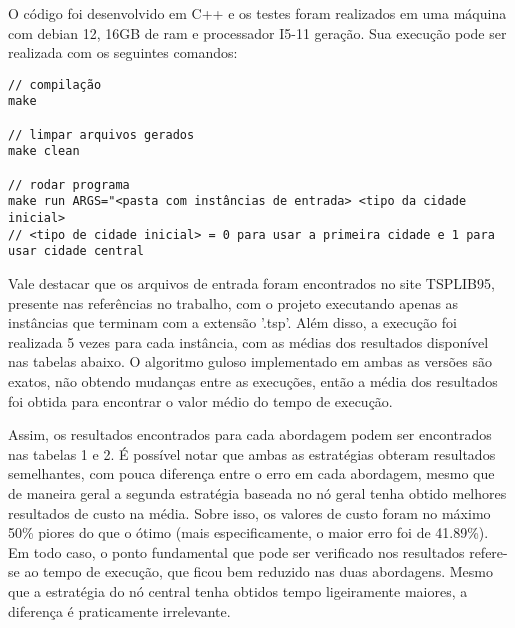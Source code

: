\documentclass[10pt]{extarticle} %
\begin{document}
O código foi desenvolvido em C++ e os testes foram realizados em uma máquina com debian 12, 16GB de ram e processador I5-11 geração. Sua execução pode ser realizada com os seguintes comandos:

\begin{verbatim}
// compilação
make

// limpar arquivos gerados
make clean

// rodar programa
make run ARGS="<pasta com instâncias de entrada> <tipo da cidade inicial>
// <tipo de cidade inicial> = 0 para usar a primeira cidade e 1 para usar cidade central
\end{verbatim}

Vale destacar que os arquivos de entrada foram encontrados no site TSPLIB95, presente nas referências no trabalho, com o projeto executando apenas as instâncias que terminam com a extensão '.tsp'. Além disso, a execução foi realizada 5 vezes para cada instância, com as médias dos resultados disponível nas tabelas abaixo. O algoritmo guloso implementado em ambas as versões são exatos, não obtendo mudanças entre as execuções, então a média dos resultados foi obtida para encontrar o valor médio do tempo de execução.

Assim, os resultados encontrados para cada abordagem podem ser encontrados nas tabelas 1 e 2. É possível notar que ambas as estratégias obteram resultados semelhantes, com pouca diferença entre o erro em cada abordagem, mesmo que de maneira geral a segunda estratégia baseada no nó geral tenha obtido melhores resultados de custo na média. Sobre isso, os valores de custo foram no máximo 50\% piores do que o ótimo (mais especificamente, o maior erro foi de 41.89\%). Em todo caso, o ponto fundamental que pode ser verificado nos resultados refere-se ao tempo de execução, que ficou bem reduzido nas duas abordagens. Mesmo que a estratégia do nó central tenha obtidos tempo ligeiramente maiores, a diferença é praticamente irrelevante.
\end{document}
